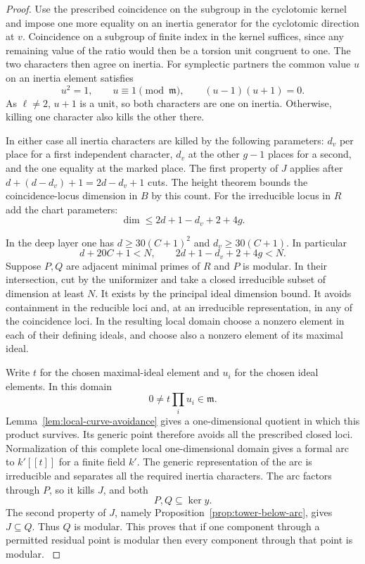 \begin{proof}
Use the prescribed coincidence on the subgroup in the
cyclotomic kernel and impose one more equality on an inertia
generator for the cyclotomic direction at \(v\). Coincidence
on a subgroup of finite index in the kernel suffices,
since any remaining value of the ratio would then be a
torsion unit congruent to one.
The two characters then agree on inertia. For symplectic partners the common value \(u\) on an inertia element satisfies
\[
 u^2=1,\qquad u\equiv1\pmod {\mathfrak m},\qquad
 (u-1)(u+1)=0 .
\]
As \(\ell\ne2\), \(u+1\) is a unit, so both characters are one on inertia. Otherwise, killing one character
also kills the other there.

In either case all inertia
characters are killed by the following parameters: \(d_v\)
per place for a first independent character, \(d_v\) at
the other \(g-1\) places for a second, and the one equality
at the marked place. The first property of \(J\) applies after
\(d+(d-d_v)+1=2d-d_v+1\) cuts. The height theorem bounds the
coincidence-locus dimension in \(B\) by this count. For the
irreducible locus in \(R\) add the chart parameters:
\[
                         \dim\le 2d+1-d_v+2+4g .
\]

In the deep layer one has \(d\geq30(C+1)^2\) and
\(d_v\geq30(C+1)\). In particular
\[
                   d+20C+1<N,\qquad
                   2d+1-d_v+2+4g<N .
\]
Suppose \(P,Q\) are adjacent minimal primes of \(R\) and
\(P\) is modular. In their intersection, cut by the
uniformizer and take a closed irreducible subset of
dimension at least \(N\). It exists by the principal ideal
dimension bound. It avoids containment in the reducible
loci and, at an irreducible representation, in any of the
coincidence loci. In the resulting local domain choose a
nonzero element in each of their defining ideals, and
choose also a nonzero element of its maximal ideal.

Write \(t\) for the chosen maximal-ideal element and \(u_i\) for the chosen ideal elements. In this domain
\[
 0\ne t\prod_i u_i\in\mathfrak m.
\]
Lemma~\ref{lem:local-curve-avoidance} gives a one-dimensional quotient in which this product survives. Its generic point therefore avoids all the prescribed closed loci.
Normalization of this complete local one-dimensional
domain gives a formal arc to \(k'[[t]]\) for a finite field
\(k'\). The generic representation of the arc is
irreducible and separates all the required inertia
characters. The arc factors through \(P\), so it kills \(J\), and both
\[
 P,Q\subseteq\ker y.
\]
The second property of \(J\), namely
Proposition~\ref{prop:tower-below-arc}, gives \(J\subseteq Q\). Thus \(Q\) is modular. This proves that
if one component through a permitted residual point is
modular then every component through that point is modular.
\label{cor:ordinary-promodularity-6}

\end{proof}

